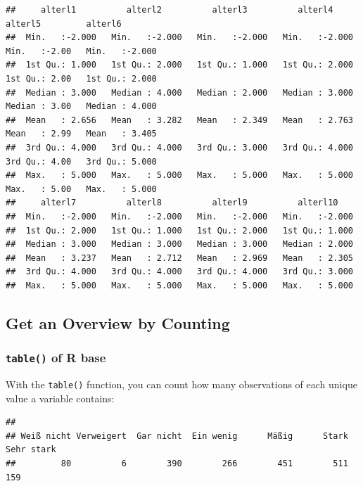 \documentclass[
  doc]{apa6}
\newenvironment{Shaded}{\begin{snugshade}}{\end{snugshade}}
\newcommand{\FunctionTok}[1]{\textcolor[rgb]{0.13,0.29,0.53}{\textbf{#1}}}
\newcommand{\NormalTok}[1]{#1}
\newcommand{\SpecialCharTok}[1]{\textcolor[rgb]{0.81,0.36,0.00}{\textbf{#1}}}
\begin{document}
\begin{verbatim}
##     alterl1          alterl2          alterl3          alterl4          alterl5         alterl6      
##  Min.   :-2.000   Min.   :-2.000   Min.   :-2.000   Min.   :-2.000   Min.   :-2.00   Min.   :-2.000  
##  1st Qu.: 1.000   1st Qu.: 2.000   1st Qu.: 1.000   1st Qu.: 2.000   1st Qu.: 2.00   1st Qu.: 2.000  
##  Median : 3.000   Median : 4.000   Median : 2.000   Median : 3.000   Median : 3.00   Median : 4.000  
##  Mean   : 2.656   Mean   : 3.282   Mean   : 2.349   Mean   : 2.763   Mean   : 2.99   Mean   : 3.405  
##  3rd Qu.: 4.000   3rd Qu.: 4.000   3rd Qu.: 3.000   3rd Qu.: 4.000   3rd Qu.: 4.00   3rd Qu.: 5.000  
##  Max.   : 5.000   Max.   : 5.000   Max.   : 5.000   Max.   : 5.000   Max.   : 5.00   Max.   : 5.000  
##     alterl7          alterl8          alterl9          alterl10     
##  Min.   :-2.000   Min.   :-2.000   Min.   :-2.000   Min.   :-2.000  
##  1st Qu.: 2.000   1st Qu.: 1.000   1st Qu.: 2.000   1st Qu.: 1.000  
##  Median : 3.000   Median : 3.000   Median : 3.000   Median : 2.000  
##  Mean   : 3.237   Mean   : 2.712   Mean   : 2.969   Mean   : 2.305  
##  3rd Qu.: 4.000   3rd Qu.: 4.000   3rd Qu.: 4.000   3rd Qu.: 3.000  
##  Max.   : 5.000   Max.   : 5.000   Max.   : 5.000   Max.   : 5.000
\end{verbatim}

\hypertarget{get-an-overview-by-counting}{%
\subsection{Get an Overview by Counting}\label{get-an-overview-by-counting}}

\hypertarget{table-of-r-base}{%
\subsubsection{\texorpdfstring{\texttt{table()} of R base}{table() of R base}}\label{table-of-r-base}}

With the \texttt{table()} function, you can count how many observations of each unique value a variable contains:

\begin{Shaded}
\end{Shaded}

\begin{verbatim}
## 
## Weiß nicht Verweigert  Gar nicht  Ein wenig      Mäßig      Stark Sehr stark 
##         80          6        390        266        451        511        159
\end{verbatim}
\end{document}
